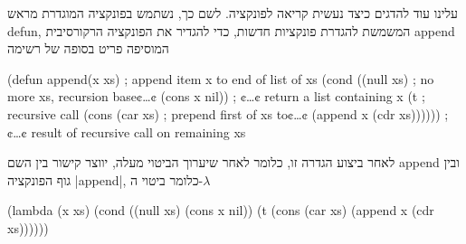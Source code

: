 עלינו עוד להדגים כיצד נעשית קריאה לפונקציה. לשם כך, נשתמש בפונקציה המוגדרת מראש
defun, המשמשת להגדרת פונקציות חדשות, כדי להגדיר את הפונקציה הרקורסיבית append
המוסיפה פריט בסופה של רשימה \begin{LISP}
(defun append(x xs) ; append item x to end of list of xs
  (cond ((null xs) ; no more xs, recursion base¢…¢
          (cons x nil)) ; ¢…¢ return a list containing x
        (t ; recursive call
          (cons
            (car xs) ; prepend first of xs to¢…¢
            (append x (cdr xs)))))) ; ¢…¢ result of recursive call on remaining xs
\end{LISP}

לאחר ביצוע הגדרה זו, כלומר לאחר שיערוך הביטוי מעלה, יווצר קישור בין השם append
ובין גוף הפונקציה \E|append|, כלומר ביטוי ה-$λ$
\begin{LISP}
(lambda (x xs)
  (cond ((null xs) (cons x nil))
        (t (cons
              (car xs)
              (append x (cdr xs))))))
\end{LISP}

